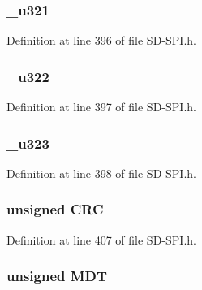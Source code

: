\subsubsection[{\+\_\+u321}]{ \+\_\+u321}\label{union_c_i_d_afcfcec75ab1ad51ac055518c4e4481b1}


Definition at line 396 of file S\+D-\/\+S\+P\+I.\+h.

\hypertarget{union_c_i_d_a35670bdcd4d10351e71df6cd3d3ac95b}{}
\subsubsection[{\+\_\+u322}]{ \+\_\+u322}\label{union_c_i_d_a35670bdcd4d10351e71df6cd3d3ac95b}


Definition at line 397 of file S\+D-\/\+S\+P\+I.\+h.

\hypertarget{union_c_i_d_a48410d35cd59cf3964706daf7c80d8fa}{}
\subsubsection[{\+\_\+u323}]{ \+\_\+u323}\label{union_c_i_d_a48410d35cd59cf3964706daf7c80d8fa}


Definition at line 398 of file S\+D-\/\+S\+P\+I.\+h.

\hypertarget{union_c_i_d_ab9e9fe7c42064ff2fcd04adcda3a6919}{}
\subsubsection[{C\+R\+C}]{\setlength{\rightskip}{0pt plus 5cm}unsigned C\+R\+C}\label{union_c_i_d_ab9e9fe7c42064ff2fcd04adcda3a6919}


Definition at line 407 of file S\+D-\/\+S\+P\+I.\+h.

\hypertarget{union_c_i_d_aacb515a9b50f4dd733a1a8b550d1d2be}{}
\subsubsection[{M\+D\+T}]{\setlength{\rightskip}{0pt plus 5cm}unsigned M\+D\+T}\label{union_c_i_d_aacb515a9b50f4dd733a1a8b550d1d2be}


